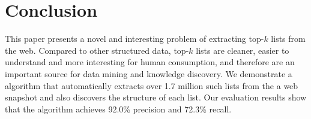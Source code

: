 %
%
%
%
%
%
%
%



\section{Conclusion}
\label{sec:conclusion}
This paper presents a novel and interesting problem of extracting
top-$k$ lists from the web.  Compared to other structured data,
top-$k$ lists are cleaner, easier to understand and more
interesting for human consumption, and therefore are an important
source for data mining and knowledge discovery. We demonstrate a
algorithm that automatically extracts over 1.7 million such lists from
the a web snapshot and also discovers the structure of each list.  Our
evaluation results show that the algorithm achieves 92.0\% precision
and 72.3\% recall.

